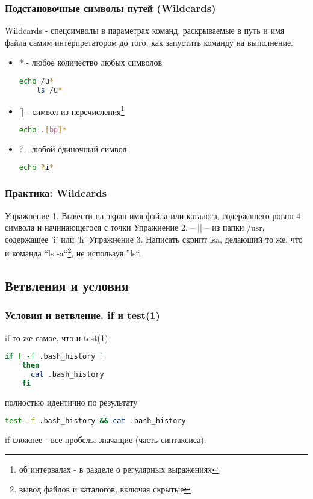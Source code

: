 \begin{frame}[fragile]
  \frametitle{Подстановочные символы путей (Wildcards)}

  \alert{Wildcards} - спецсимволы в параметрах команд, раскрываемые в путь и имя файла самим интерпретатором до того, как запустить команду на выполнение. \pause


  \begin{itemize}
    \item \alert{*} - любое количество любых символов
      \begin{lstlisting}[language=sh,frame=single,basicstyle=\normalsize,breaklines=true]
	echo /u*
	ls /u*
      \end{lstlisting} \pause
    \item \alert{[]} - символ из перечисления\footnote{об интервалах - в разделе о регулярных выражениях}
      \begin{lstlisting}[language=sh,frame=single,basicstyle=\normalsize,breaklines=true]
	echo .[bp]*
      \end{lstlisting} \pause
    \item \alert{?} - любой одиночный символ
      \begin{lstlisting}[language=sh,frame=single,basicstyle=\normalsize,breaklines=true]
	echo ?i*
      \end{lstlisting} 
  \end{itemize}

\end{frame}

\begin{frame}
  \frametitle{Практика: Wildcards}

  \alert{Упражнение 1.} Вывести на экран имя файла или каталога, содержащего ровно 4 символа и начинающегося с точки
  \pause
  \alert{Упражнение 2.} -- || --  из папки /usr, содержащее 'i' или 'h'
  \pause
  \alert{Упражнение 3.} Написать скрипт lsa, делающий то же, что и команда ``ls -a``\footnote{вывод файлов и каталогов, включая скрытые}, не используя ''ls``.
\end{frame}

\subsection{Ветвления и условия}

\begin{frame}[fragile]
  \frametitle{Условия и ветвление. if и test(1)}

  \alert{if то же самое, что и test(1)} \pause

      \begin{lstlisting}[language=sh,frame=single,basicstyle=\normalsize,breaklines=true]
	if [ -f .bash_history ]
	then
	  cat .bash_history
	fi
      \end{lstlisting} 
      полностью идентично по результату
      \begin{lstlisting}[language=sh,frame=single,basicstyle=\normalsize,breaklines=true]
	test -f .bash_history && cat .bash_history
      \end{lstlisting}
      if сложнее - все пробелы значащие (часть синтаксиса).
\end{frame}

